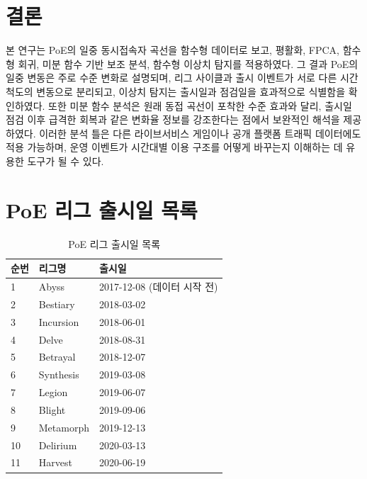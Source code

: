 \documentclass[11pt,a4paper]{article}
\begin{document}
\section{결론}
본 연구는 PoE의 일중 동시접속자 곡선을 함수형 데이터로 보고, 평활화, FPCA, 함수형 회귀, 미분 함수 기반 보조 분석, 함수형 이상치 탐지를 적용하였다. 그 결과 PoE의 일중 변동은 주로 수준 변화로 설명되며, 리그 사이클과 출시 이벤트가 서로 다른 시간 척도의 변동으로 분리되고, 이상치 탐지는 출시일과 점검일을 효과적으로 식별함을 확인하였다. 또한 미분 함수 분석은 원래 동접 곡선이 포착한 수준 효과와 달리, 출시일 점검 이후 급격한 회복과 같은 변화율 정보를 강조한다는 점에서 보완적인 해석을 제공하였다. 이러한 분석 틀은 다른 라이브서비스 게임이나 공개 플랫폼 트래픽 데이터에도 적용 가능하며, 운영 이벤트가 시간대별 이용 구조를 어떻게 바꾸는지 이해하는 데 유용한 도구가 될 수 있다.

\newpage



\newpage
\appendix
\section{PoE 리그 출시일 목록}
\begin{table}[H]
\centering
\caption{PoE 리그 출시일 목록}
\begin{tabular}{lll}
\toprule
순번 & 리그명 & 출시일 \\
\midrule
1 & Abyss & 2017-12-08 (데이터 시작 전) \\
2 & Bestiary & 2018-03-02 \\
3 & Incursion & 2018-06-01 \\
4 & Delve & 2018-08-31 \\
5 & Betrayal & 2018-12-07 \\
6 & Synthesis & 2019-03-08 \\
7 & Legion & 2019-06-07 \\
8 & Blight & 2019-09-06 \\
9 & Metamorph & 2019-12-13 \\
10 & Delirium & 2020-03-13 \\
11 & Harvest & 2020-06-19 \\
\bottomrule
\end{tabular}
\end{table}
\end{document}
